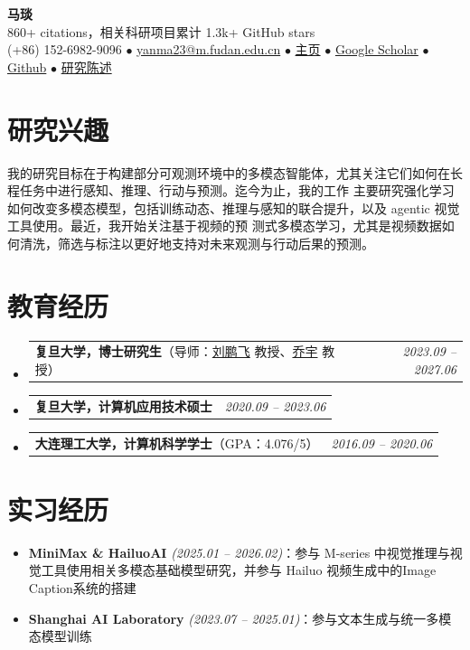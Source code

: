 \documentclass{resume}
\makeatletter
\newcommand{\ExperienceListStart}{
    \vspace{-1pt}\begin{itemize}[leftmargin=1.2em,itemsep=5pt,topsep=2pt,parsep=2pt]
}
\newcommand{\ExperienceListEnd}{
    \end{itemize}\vspace{-5pt}
}
\newcommand{\Experience}[3]{
    \item \small \textbf{#1} \textit{(#2)}：#3
}
\newcommand{\EducationEntry}[2]{
  \vspace{-1pt}\item
    \begin{tabular*}{0.97\textwidth}[t]{@{}p{0.78\textwidth}@{\extracolsep{\fill}}r@{}}
      \small #1 & \small\textit{#2} \\
    \end{tabular*}\vspace{0pt}
}
\newcommand{\educationListStart}{\begin{itemize}[leftmargin=*, itemsep=4pt, topsep=2pt, parsep=2pt]}
\newcommand{\educationListEnd}{\end{itemize}}
\makeatother
\begin{document}

\begin{center}
{\LARGE \scshape \bfseries 马琰} \\ \vspace{2pt}
{\footnotesize 860+ citations，相关科研项目累计 1.3k+ GitHub stars} \\ \vspace{2pt}
(+86) 152-6982-9096 $\bullet$
\href{mailto:yanma23@m.fudan.edu.cn}{yanma23@m.fudan.edu.cn} $\bullet$
\href{https://yanmaaaa.github.io}{主页} $\bullet$
\href{https://scholar.google.com/citations?user=tnJyAAoAAAAJ\&hl=en}{Google Scholar} $\bullet$
\href{https://github.com/mantle2048}{Github} $\bullet$
\href{https://yanmaaaa.github.io/assets/research_statement.pdf}{研究陈述}
\end{center}

\section{研究兴趣}
我的研究目标在于构建部分可观测环境中的多模态智能体，尤其关注它们如何在长程任务中进行感知、推理、行动与预测。迄今为止，我的工作 主要研究强化学习如何改变多模态模型，包括训练动态、推理与感知的联合提升，以及 agentic 视觉工具使用。最近，我开始关注基于视频的预 测式多模态学习，尤其是视频数据如何清洗，筛选与标注以更好地支持对未来观测与行动后果的预测。

\section{教育经历}
  \educationListStart
    \EducationEntry{\textbf{复旦大学，博士研究生}（导师：\href{https://scholar.google.co.jp/citations?user=oIz_CYEAAAAJ\&hl=en}{刘鹏飞} 教授、\href{https://mmlab.siat.ac.cn/yuqiao}{乔宇} 教授）}{2023.09 -- 2027.06}
    \EducationEntry{\textbf{复旦大学，计算机应用技术硕士}}{2020.09 -- 2023.06}
    \EducationEntry{\textbf{大连理工大学，计算机科学学士}（GPA：4.076/5）}{2016.09 -- 2020.06}
  \educationListEnd

\section{实习经历}
  \ExperienceListStart
    \Experience{MiniMax \& HailuoAI}{2025.01 -- 2026.02}{参与 M-series 中视觉推理与视觉工具使用相关多模态基础模型研究，并参与 Hailuo 视频生成中的Image Caption系统的搭建}
    \Experience{Shanghai AI Laboratory}{2023.07 -- 2025.01}{参与文本生成与统一多模态模型训练}
  \ExperienceListEnd
\end{document}
